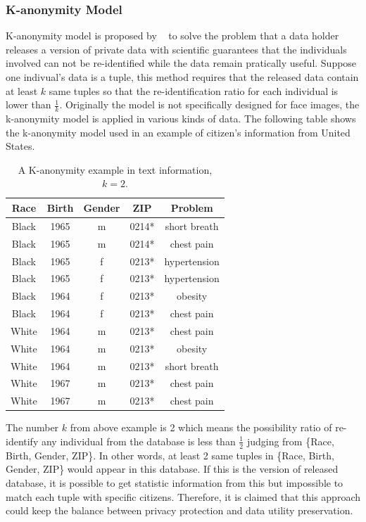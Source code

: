 	\subsubsection{K-anonymity Model}
	K-anonymity model is proposed by ~\cite{Sweeney02} to solve the problem that 
	a data holder releases a version of private data with scientific guarantees 
	that the individuals involved can not be re-identified while the data remain 
	pratically useful. Suppose one indivual's data is a tuple, this method requires 
	that the released data contain at least $k$ same tuples so that the 
	re-identification ratio for each individual is lower than $\frac{1}{k}$. 
	Originally the model is not specifically designed for face images, the 
	k-anonymity model is applied in various kinds of data. The following table 
	shows the k-anonymity model used in an example of citizen's information 
	from United States. \newline
		\begin{table}[!htb]
		\centering
			\begin{tabular}{|c|c|c|c|c|}
				\hline
				\textbf{Race} & \textbf{Birth} & \textbf{Gender} & \textbf{ZIP} & \textbf{Problem} \\
				\hline
				Black & 1965 & m & 0214* & short breath \\
				\hline
				Black & 1965 & m & 0214* & chest pain \\
				\hline
				Black & 1965 & f & 0213* & hypertension \\
				\hline
				Black & 1965 & f & 0213* & hypertension \\
				\hline
				Black & 1964 & f & 0213* & obesity \\
				\hline
				Black & 1964 & f & 0213* & chest pain \\
				\hline
				White & 1964 & m & 0213* & chest pain \\
				\hline
				White & 1964 & m & 0213* & obesity \\
				\hline
				White & 1964 & m & 0213* & short breath \\
				\hline
				White & 1967 & m & 0213* & chest pain \\
				\hline
				White & 1967 & m & 0213* & chest pain \\
				\hline
			\end{tabular}
			\caption{A K-anonymity example in text information, $k = 2$.} 
		\end{table}	

		The number $k$ from above example is 2 which means the possibility ratio 
		of re-identify any individual from the database is less than $\frac{1}{2}$ 
		judging from \{Race, Birth, Gender, ZIP\}. In other words, at least 2 same 
		tuples in \{Race, Birth, Gender, ZIP\} would appear in this database. 
		If this is the version of released database, it is possible to get statistic 
		information from this but impossible to match each tuple with specific citizens. 
		Therefore, it is claimed that this approach could keep the balance between privacy 
		protection and data utility preservation. 

